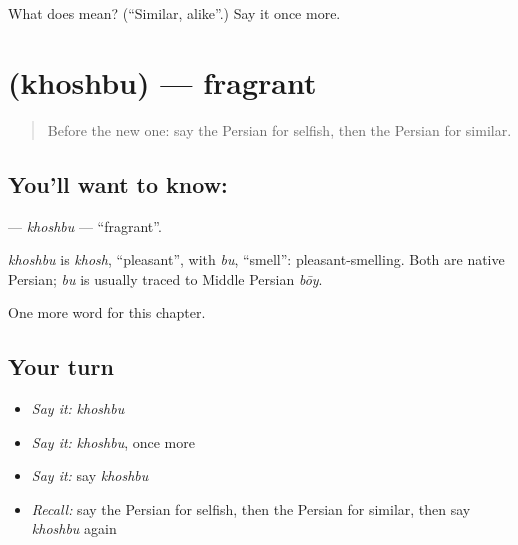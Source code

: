 \begin{tcolorbox}[breakable,colback=teal!4,colframe=teal!35!black,title={Before you move on}]
What does  mean? (\textquotedblleft{}Similar, alike\textquotedblright{}.) Say it once more.
\end{tcolorbox}
\section[\texorpdfstring{\fa{خوشبو} (khoshbu)}{خوشبو (khoshbu)}]{ (khoshbu) — fragrant}

\label{lesson:FA-C201-khoshbu}



\begin{quote}
Before the new one: say the Persian for selfish, then the Persian for similar.
\end{quote}

\subsection*{You'll want to know: }
\textbf{} — \emph{khoshbu} — \textquotedblleft{}fragrant\textquotedblright{}.

\begin{cousinweb}
\emph{khoshbu} is \emph{khosh}, \textquotedblleft{}pleasant\textquotedblright{}, with \emph{bu}, \textquotedblleft{}smell\textquotedblright{}: pleasant-smelling. Both are native Persian; \emph{bu} is usually traced to Middle Persian \emph{bōy}.
\end{cousinweb}

\begin{grammarlens}[title={What you've built}]
One more word for this chapter.
\end{grammarlens}

\subsection*{Your turn}
\begin{itemize}
\raggedright
  \item \emph{Say it:} \emph{khoshbu}
  \item \emph{Say it:} \emph{khoshbu}, once more
  \item \emph{Say it:} say \emph{khoshbu}
  \item \emph{Recall:} say the Persian for selfish, then the Persian for similar, then say \emph{khoshbu} again
\end{itemize}

